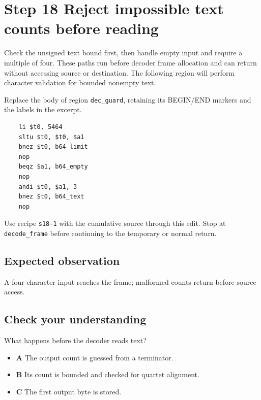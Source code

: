 \section{Step 18 Reject impossible text counts before reading}\label{base64-s18}

Check the unsigned text bound first, then handle empty input and require a multiple of four. These paths run before decoder frame allocation and can return without accessing source or destination. The following region will perform character validation for bounded nonempty text.

Replace the body of region \texttt{dec\_guard}, retaining its BEGIN/END markers and the labels in the excerpt.

\begin{verbatim}
    li $t0, 5464
    sltu $t0, $t0, $a1
    bnez $t0, b64_limit
    nop
    beqz $a1, b64_empty
    nop
    andi $t0, $a1, 3
    bnez $t0, b64_text
    nop
\end{verbatim}

Use recipe \texttt{s18-1} with the cumulative source through this edit. Stop at \texttt{decode\_frame} before continuing to the temporary or normal return.

\subsection{Expected observation}
A four-character input reaches the frame; malformed counts return before source access.

\subsection{Check your understanding}
What happens before the decoder reads text?

\begin{itemize}
  \item \textbf{A} The output count is guessed from a terminator.
  \item \textbf{B} Its count is bounded and checked for quartet alignment.
  \item \textbf{C} The first output byte is stored.
\end{itemize}
